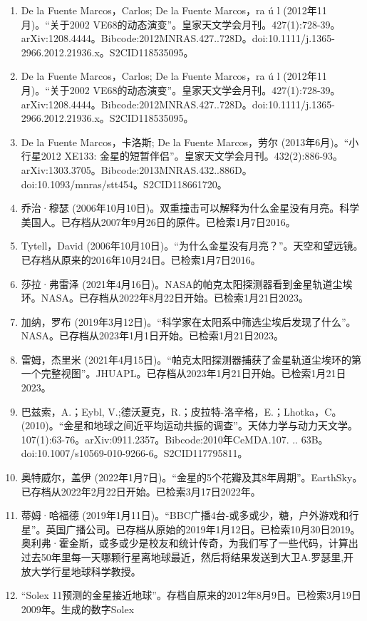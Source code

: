 \begin{enumerate}
\item De la Fuente Marcos，Carlos; De la Fuente Marcos，ra ú l (2012年11月)。“关于2002 VE68的动态演变”。皇家天文学会月刊。427(1):728-39。arXiv:1208.4444。Bibcode:2012MNRAS.427..728D。doi:10.1111/j.1365-2966.2012.21936.x。S2CID118535095。 
\item De la Fuente Marcos，Carlos; De la Fuente Marcos，ra ú l (2012年11月)。“关于2002 VE68的动态演变”。皇家天文学会月刊。427(1):728-39。arXiv:1208.4444。Bibcode:2012MNRAS.427..728D。doi:10.1111/j.1365-2966.2012.21936.x。S2CID118535095。 
\item De la Fuente Marcos，卡洛斯; De la Fuente Marcos，劳尔 (2013年6月)。“小行星2012 XE133: 金星的短暂伴侣”。皇家天文学会月刊。432(2):886-93。arXiv:1303.3705。Bibcode:2013MNRAS.432..886D。doi:10.1093/mnras/stt454。S2CID118661720。 
\item 乔治·穆瑟 (2006年10月10日)。双重撞击可以解释为什么金星没有月亮。科学美国人。已存档从2007年9月26日的原件。已检索1月7日2016。
\item Tytell，David (2006年10月10日)。“为什么金星没有月亮？”。天空和望远镜。已存档从原来的2016年10月24日。已检索1月7日2016。
\item 莎拉·弗雷泽 (2021年4月16日)。NASA的帕克太阳探测器看到金星轨道尘埃环。NASA。已存档从2022年8月22日开始。已检索1月21日2023。
\item 加纳，罗布 (2019年3月12日)。“科学家在太阳系中筛选尘埃后发现了什么”。NASA。已存档从2023年1月1日开始。已检索1月21日2023。
\item 雷姆，杰里米 (2021年4月15日)。“帕克太阳探测器捕获了金星轨道尘埃环的第一个完整视图”。JHUAPL。已存档从2023年1月21日开始。已检索1月21日2023。
\item 巴兹索，A.；Eybl, V.;德沃夏克，R.；皮拉特-洛辛格，E.；Lhotka，C。(2010)。“金星和地球之间近平均运动共振的调查”。天体力学与动力天文学。107(1):63-76。arXiv:0911.2357。Bibcode:2010年CeMDA.107. .. 63B。doi:10.1007/s10569-010-9266-6。S2CID117795811。 
\item 奥特威尔，盖伊 (2022年1月7日)。“金星的5个花瓣及其8年周期”。EarthSky。已存档从2022年2月22日开始。已检索3月17日2022年。
\item 蒂姆·哈福德 (2019年1月11日)。“BBC广播4台-或多或少，糖，户外游戏和行星”。英国广播公司。已存档从原始的2019年1月12日。已检索10月30日2019。奥利弗·霍金斯，或多或少是校友和统计传奇，为我们写了一些代码，计算出过去50年里每一天哪颗行星离地球最近，然后将结果发送到大卫A.罗瑟里,开放大学行星地球科学教授。
\item “Solex 11预测的金星接近地球”。存档自原来的2012年8月9日。已检索3月19日2009年。生成的数字Solex

\end{enumerate}
